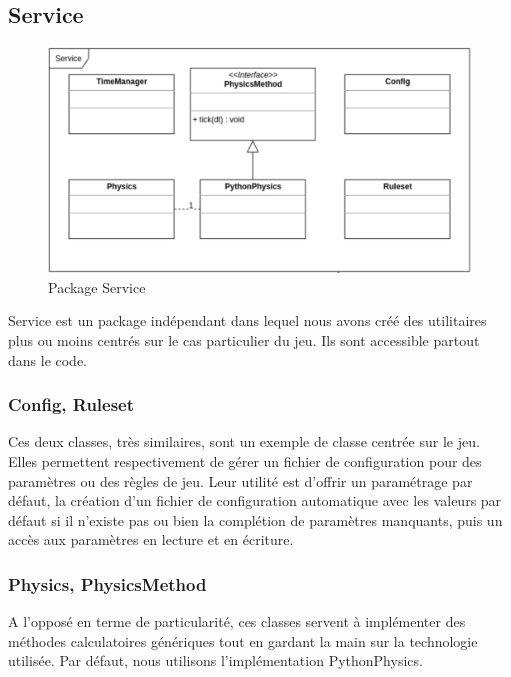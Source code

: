 \clearpage
\subsection{Service}

\begin{figure}[H]
    \centering
    \includegraphics[scale=0.55]{data/archi/service.png}
    \caption{Package Service}
\end{figure}

Service est un package indépendant dans lequel nous avons créé des utilitaires plus ou moins centrés sur le cas particulier du jeu. Ils sont accessible partout dans le code.

\subsubsection{Config, Ruleset}

Ces deux classes, très similaires, sont un exemple de classe centrée sur le jeu. Elles permettent respectivement de gérer un fichier de configuration pour des paramètres ou des règles de jeu. Leur utilité est d'offrir un paramétrage par défaut, la création d'un fichier de configuration automatique avec les valeurs par défaut si il n'existe pas ou bien la complétion de paramètres manquants, puis un accès aux paramètres en lecture et en écriture.

\subsubsection{Physics, PhysicsMethod}

A l'opposé en terme de particularité, ces classes servent à implémenter des méthodes calculatoires génériques tout en gardant la main sur la technologie utilisée. Par défaut, nous utilisons l'implémentation PythonPhysics.

